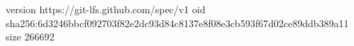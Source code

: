 version https://git-lfs.github.com/spec/v1
oid sha256:6d3246bbcf092703f82e2dc93d84c8137e8f08e3cb593f67d02ce89ddb389a11
size 266692
